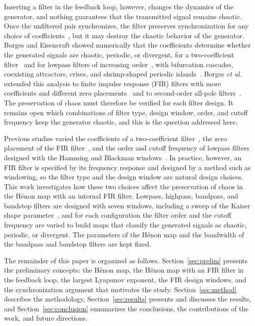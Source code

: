 \documentclass[journal]{IEEEtran}
\begin{document}
Inserting a filter in the feedback loop, however, changes the dynamics of the
generator, and nothing guarantees that the transmitted signal remains
chaotic. Once the unfiltered pair synchronizes, the filter preserves
synchronization for any choice of coefficients~\cite{BorgesTese2026}, but it
may destroy the chaotic behavior of the generator. Borges and Eisencraft
showed numerically that the coefficients determine whether the generated
signals are chaotic, periodic, or divergent, for a two-coefficient
filter~\cite{BorgesCSF2022} and for lowpass filters of increasing
order~\cite{Borges2022sbrt}, with bifurcation cascades, coexisting
attractors, crises, and shrimp-shaped periodic islands~\cite{Gallas1993}.
Borges \textit{et al.} extended this analysis to finite impulse response (FIR) filters with more
coefficients and different zero placements~\cite{BorgesCNSNS2024} and to
second-order all-pole filters~\cite{Borges2024sbrt}. The preservation of
chaos must therefore be verified for each filter design. It remains open
which combinations of filter type, design window, order, and cutoff
frequency keep the generator chaotic, and this is the question addressed
here.

Previous studies varied the coefficients of a two-coefficient
filter~\cite{BorgesCSF2022}, the zero placement of the FIR
filter~\cite{BorgesCNSNS2024}, and the order and cutoff frequency of lowpass
filters designed with the Hamming and Blackman
windows~\cite{Borges2022sbrt,BorgesCNSNS2024}.
In practice, however, an FIR filter is specified by its frequency response
and designed by a method such as windowing, so the filter type and the design
window are natural design choices. This work investigates how these two
choices affect the preservation of chaos in the H\'enon map with an internal
FIR filter. Lowpass, highpass, bandpass, and bandstop filters are designed
with seven windows, including a sweep of the Kaiser shape
parameter~\cite{Kaiser1980}, and for each configuration the filter order and
the cutoff frequency are varied to build maps that classify the generated
signals as chaotic, periodic, or divergent. The parameters of the H\'enon map
and the bandwidth of the bandpass and bandstop filters are kept fixed.

The remainder of this paper is organized as follows.
Section~\ref{sec:prelim} presents the preliminary concepts: the H\'enon map,
the H\'enon map with an FIR filter in the feedback loop, the largest Lyapunov
exponent, the FIR design windows, and the synchronization argument that
motivates the study. Section~\ref{sec:method} describes the methodology,
Section~\ref{sec:results} presents and discusses the results, and
Section~\ref{sec:conclusion} summarizes the conclusions, the contributions of
the work, and future directions.
\end{document}
